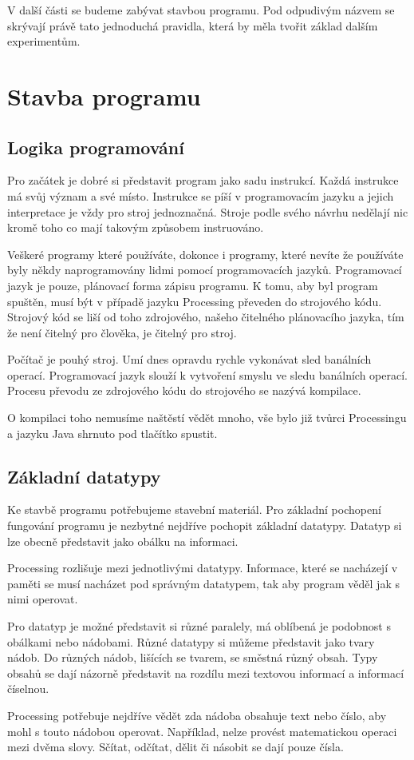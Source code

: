 \documentclass[10pt,twopage]{book}
\newcommand{\oddil}[1]{\section{#1}\label{sec:#1}}
\newcommand{\pododdil}[1]{\subsection{#1}\label{subsec:#1}}
\begin{document}
V další části se budeme zabývat stavbou programu. Pod odpudivým názvem se skrývají právě tato jednoduchá pravidla, která by měla tvořit základ dalším experimentům.   

\newpage
\oddil{Stavba programu}

\pododdil{Logika programování}
Pro začátek je dobré si představit program jako sadu instrukcí. Každá instrukce má svůj význam a své místo. Instrukce se píší v programovacím jazyku a jejich interpretace je vždy pro stroj jednoznačná. Stroje podle svého návrhu nedělají nic kromě toho co mají takovým způsobem instruováno.

Veškeré programy které používáte, dokonce i programy, které nevíte že používáte byly někdy naprogramovány lidmi pomocí programovacích jazyků. Programovací jazyk je pouze, plánovací forma zápisu programu. K tomu, aby byl program spuštěn, musí být v případě jazyku Processing převeden do strojového kódu. Strojový kód se liší od toho zdrojového, našeho čitelného plánovacího jazyka, tím že není čitelný pro člověka, je čitelný pro stroj.

Počítač je pouhý stroj. Umí dnes opravdu rychle vykonávat sled banálních operací. Programovací jazyk slouží k vytvoření smyslu ve sledu banálních operací. Procesu převodu ze zdrojového kódu do strojového se nazývá kompilace.

O kompilaci toho nemusíme naštěstí vědět mnoho, vše bylo již tvůrci Processingu a jazyku Java shrnuto pod tlačítko spustit.

\pododdil{Základní datatypy}

Ke stavbě programu potřebujeme stavební materiál. Pro základní pochopení fungování programu je nezbytné nejdříve pochopit základní datatypy. Datatyp si lze obecně představit jako obálku na informaci.

Processing rozlišuje mezi jednotlivými datatypy. Informace, které se nacházejí v paměti se musí nacházet pod správným datatypem, tak aby program věděl jak s nimi operovat.

Pro datatyp je možné představit si různé paralely, má oblíbená je podobnost s obálkami nebo nádobami. Různé datatypy si můžeme představit jako tvary nádob. Do různých nádob, lišících se tvarem, se směstná různý obsah. Typy obsahů se dají názorně představit na rozdílu mezi textovou informací a informací číselnou.

Processing potřebuje nejdříve vědět zda nádoba obsahuje text nebo číslo, aby mohl s touto nádobou operovat. Například, nelze provést matematickou operaci mezi dvěma slovy. Sčítat, odčítat, dělit či násobit se dají pouze čísla.
\end{document}
